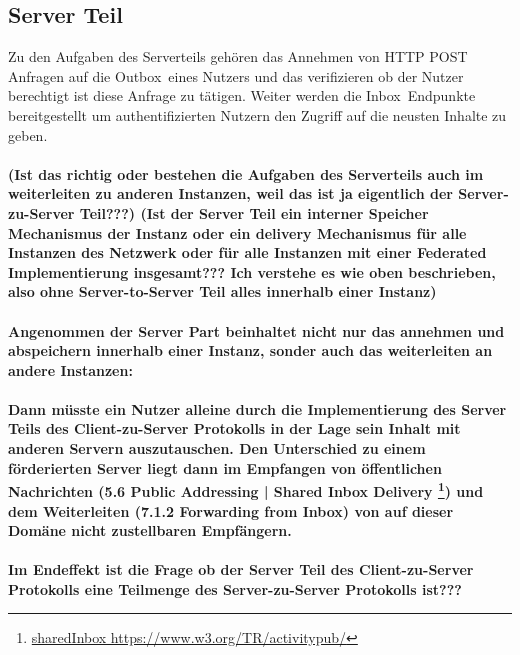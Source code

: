 	\subsection{Server Teil}
  		Zu den Aufgaben des Serverteils gehören das Annehmen von HTTP POST Anfragen auf die \glqq Outbox\grqq~eines Nutzers und das verifizieren ob der Nutzer berechtigt ist diese Anfrage zu tätigen. Weiter werden die \glqq Inbox\grqq~Endpunkte bereitgestellt um authentifizierten Nutzern den Zugriff auf die neusten Inhalte zu geben.
  		\\\\
  		\textbf{(Ist das richtig oder bestehen die Aufgaben des Serverteils auch im weiterleiten zu anderen Instanzen, weil das ist ja eigentlich der Server-zu-Server Teil???) (Ist der Server Teil ein interner Speicher Mechanismus der Instanz oder ein delivery Mechanismus für alle Instanzen des Netzwerk oder für alle Instanzen mit einer Federated Implementierung insgesamt??? Ich verstehe es wie oben beschrieben, also ohne Server-to-Server Teil alles innerhalb einer Instanz)
  		\\\\
  		Angenommen der Server Part beinhaltet nicht nur das annehmen und abspeichern innerhalb einer Instanz, sonder auch das weiterleiten an andere Instanzen:
  		\\\\
  		Dann müsste ein Nutzer alleine durch die Implementierung des Server Teils des Client-zu-Server Protokolls in der Lage sein Inhalt mit anderen Servern auszutauschen. Den Unterschied zu einem förderierten Server liegt dann im Empfangen von öffentlichen Nachrichten (5.6 Public Addressing | Shared Inbox Delivery \footnote{\href{https://www.w3.org/TR/activitypub/}{sharedInbox https://www.w3.org/TR/activitypub/}}) und dem Weiterleiten (7.1.2 Forwarding from Inbox) von auf dieser Domäne nicht zustellbaren Empfängern.\\\\ Im Endeffekt ist die Frage ob der Server Teil des Client-zu-Server Protokolls eine Teilmenge des Server-zu-Server Protokolls ist???}
